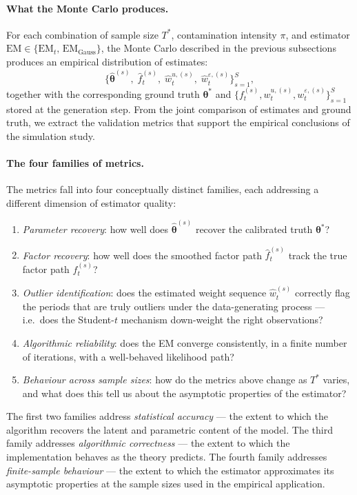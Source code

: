 \documentclass[11pt, a4paper, oneside]{article}
\begin{document}
\paragraph{What the Monte Carlo produces.}
For each combination of sample size $T^*$, contamination intensity
$\pi$, and estimator $\mathrm{EM} \in \{\mathrm{EM}_t,\, \mathrm{EM}_{\mathrm{Gauss}}\}$,
the Monte Carlo described in the previous subsections produces an
empirical distribution of estimates:
\[
\Big\{\hat{\boldsymbol{\theta}}^{(s)},\; \hat{f}_t^{(s)},\; \hat{w}_t^{u,(s)},\; \hat{w}_t^{\varepsilon,(s)}\Big\}_{s=1}^{S},
\]
together with the corresponding ground truth
$\boldsymbol{\theta}^*$ and $\{f_t^{(s)}, w_t^{u,(s)}, w_t^{\varepsilon,(s)}\}_{s=1}^{S}$
stored at the generation step. From the joint comparison of
estimates and ground truth, we extract the validation metrics that
support the empirical conclusions of the simulation study.

\paragraph{The four families of metrics.}
The metrics fall into four conceptually distinct families, each
addressing a different dimension of estimator quality:
\begin{enumerate}[leftmargin=1.5em, itemsep=4pt]
    \item \emph{Parameter recovery}: how well does
          $\hat{\boldsymbol{\theta}}^{(s)}$ recover the calibrated
          truth $\boldsymbol{\theta}^*$?
    \item \emph{Factor recovery}: how well does the smoothed factor
          path $\hat{f}_t^{(s)}$ track the true factor path
          $f_t^{(s)}$?
    \item \emph{Outlier identification}: does the estimated weight
          sequence $\hat{w}_t^{(s)}$ correctly flag the periods that
          are truly outliers under the data-generating process — i.e.\
          does the Student-$t$ mechanism down-weight the right
          observations?
    \item \emph{Algorithmic reliability}: does the EM converge
          consistently, in a finite number of iterations, with a
          well-behaved likelihood path?
    \item \emph{Behaviour across sample sizes}: how do the metrics
          above change as $T^*$ varies, and what does this tell us
          about the asymptotic properties of the estimator?
\end{enumerate}
The first two families address \emph{statistical accuracy} — the
extent to which the algorithm recovers the latent and parametric
content of the model. The third family addresses
\emph{algorithmic correctness} — the extent to which the
implementation behaves as the theory predicts. The fourth family
addresses \emph{finite-sample behaviour} — the extent to which the
estimator approximates its asymptotic properties at the sample sizes
used in the empirical application.
\end{document}
